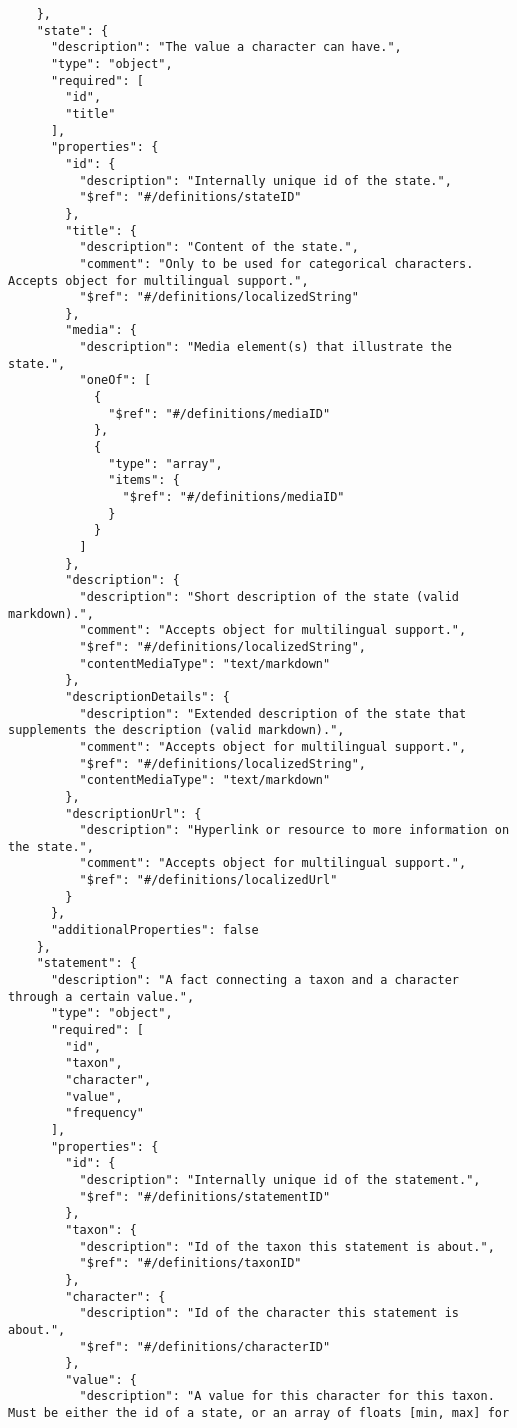 \documentclass[10pt,letterpaper]{article}
\begin{document}
\begin{verbatim}
    },
    "state": {
      "description": "The value a character can have.",
      "type": "object",
      "required": [
        "id",
        "title"
      ],
      "properties": {
        "id": {
          "description": "Internally unique id of the state.",
          "$ref": "#/definitions/stateID"
        },
        "title": {
          "description": "Content of the state.",
          "comment": "Only to be used for categorical characters.
Accepts object for multilingual support.",
          "$ref": "#/definitions/localizedString"
        },
        "media": {
          "description": "Media element(s) that illustrate the
state.",
          "oneOf": [
            {
              "$ref": "#/definitions/mediaID"
            },
            {
              "type": "array",
              "items": {
                "$ref": "#/definitions/mediaID"
              }
            }
          ]
        },
        "description": {
          "description": "Short description of the state (valid
markdown).",
          "comment": "Accepts object for multilingual support.",
          "$ref": "#/definitions/localizedString",
          "contentMediaType": "text/markdown"
        },
        "descriptionDetails": {
          "description": "Extended description of the state that
supplements the description (valid markdown).",
          "comment": "Accepts object for multilingual support.",
          "$ref": "#/definitions/localizedString",
          "contentMediaType": "text/markdown"
        },
        "descriptionUrl": {
          "description": "Hyperlink or resource to more information on
the state.",
          "comment": "Accepts object for multilingual support.",
          "$ref": "#/definitions/localizedUrl"
        }
      },
      "additionalProperties": false
    },
    "statement": {
      "description": "A fact connecting a taxon and a character
through a certain value.",
      "type": "object",
      "required": [
        "id",
        "taxon",
        "character",
        "value",
        "frequency"
      ],
      "properties": {
        "id": {
          "description": "Internally unique id of the statement.",
          "$ref": "#/definitions/statementID"
        },
        "taxon": {
          "description": "Id of the taxon this statement is about.",
          "$ref": "#/definitions/taxonID"
        },
        "character": {
          "description": "Id of the character this statement is
about.",
          "$ref": "#/definitions/characterID"
        },
        "value": {
          "description": "A value for this character for this taxon.
Must be either the id of a state, or an array of floats [min, max] for

\end{verbatim}
\end{document}
